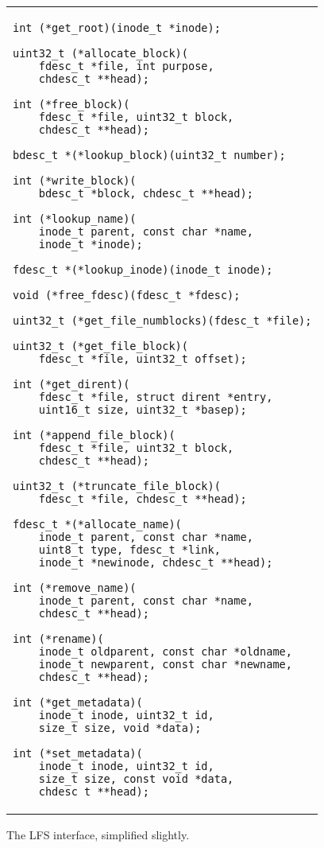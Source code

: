 \begin{figure}[htb]
\vskip-14pt
\begin{tabular}{@{\hskip0.25in}p{2in}@{}}
\begin{scriptsize}
\begin{verbatim}
int (*get_root)(inode_t *inode);

uint32_t (*allocate_block)(
    fdesc_t *file, int purpose,
    chdesc_t **head);

int (*free_block)(
    fdesc_t *file, uint32_t block,
    chdesc_t **head);

bdesc_t *(*lookup_block)(uint32_t number);

int (*write_block)(
    bdesc_t *block, chdesc_t **head);

int (*lookup_name)(
    inode_t parent, const char *name,
    inode_t *inode);

fdesc_t *(*lookup_inode)(inode_t inode);

void (*free_fdesc)(fdesc_t *fdesc);

uint32_t (*get_file_numblocks)(fdesc_t *file);

uint32_t (*get_file_block)(
    fdesc_t *file, uint32_t offset);

int (*get_dirent)(
    fdesc_t *file, struct dirent *entry,
    uint16_t size, uint32_t *basep);

int (*append_file_block)(
    fdesc_t *file, uint32_t block,
    chdesc_t **head);

uint32_t (*truncate_file_block)(
    fdesc_t *file, chdesc_t **head);

fdesc_t *(*allocate_name)(
    inode_t parent, const char *name,
    uint8_t type, fdesc_t *link,
    inode_t *newinode, chdesc_t **head);

int (*remove_name)(
    inode_t parent, const char *name,
    chdesc_t **head);

int (*rename)(
    inode_t oldparent, const char *oldname,
    inode_t newparent, const char *newname,
    chdesc_t **head);

int (*get_metadata)(
    inode_t inode, uint32_t id,
    size_t size, void *data);

int (*set_metadata)(
    inode_t inode, uint32_t id,
    size_t size, const void *data,
    chdesc_t **head);
\end{verbatim}
\end{scriptsize}
\end{tabular}
\vspace{-10pt}
\caption{\label{fig:lfs} The LFS interface, simplified slightly.}
\end{figure}

